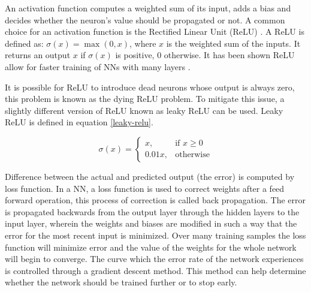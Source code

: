 An activation function computes a weighted sum of its input, adds a bias and decides whether the neuron's value should be propagated or not. A common choice for an activation function is the Rectified Linear Unit (ReLU) \cite{Relu}. A ReLU is defined as: $\sigma(x) = \max(0, x)$, where $x$ is the weighted sum of the inputs. It returns an output $x$ if $\sigma(x)$ is positive, $0$ otherwise. It has been shown ReLU allow for faster training of NNs with many layers \cite{cnn-star-galaxy}.


It is possible for ReLU to introduce dead neurons whose output is always zero, this problem is known as the dying ReLU problem. To mitigate this issue, a slightly different version of ReLU known as leaky ReLU can be used. Leaky ReLU is defined in equation \ref{leaky-relu}.

\begin{equation}
\sigma(x) =
\begin{cases} \label{leaky-relu}
    x      , & \text{if } x\geq 0\\
    0.01x , & \text{otherwise}
\end{cases}
\end{equation}

Difference between the actual and predicted output (the error) is computed by loss function. In a NN, a loss function is used to correct weights after a feed forward operation, this process of correction is called back propagation. The error is propagated backwards from the output layer through the hidden layers to the input layer, wherein the weights and biases are modified in such a way that the error for the most recent input is minimized. Over many training samples the loss function will minimize error and the value of the weights for the whole network will begin to converge. The curve which the error rate of the network experiences is controlled through a gradient descent method. This method can help determine whether the network should be trained further or to stop early.


